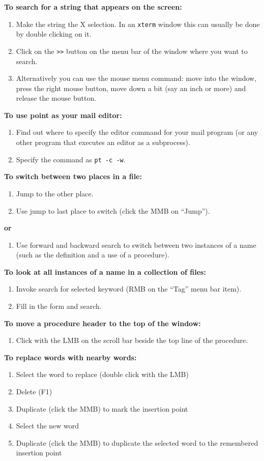 {\bf To search for a string that appears on the screen:}
\begin{enumerate}
\item Make the string the X selection.
In an {\tt xterm} window this can usually be done by double clicking on it.
\item Click on the {\tt>>} button on the menu bar of the window
where you want to search.
\item Alternatively you can use the mouse menu command:
move into the window, press the right mouse button,
move down a bit (say an inch or more) and release the mouse button.
\end{enumerate}

{\bf To use point as your mail editor:}
\begin{enumerate}
\item Find out where to specify the editor command for your mail program
(or any other program that executes an editor as a subprocess).
\item Specify the command as {\tt pt -c -w}.
\end{enumerate}

{\bf To switch between two places in a file:}
\begin{enumerate}
\item Jump to the other place.
\item Use jump to last place to switch (click the MMB on ``Jump'').
\end{enumerate}
{\bf or}
\begin{enumerate}
\item Use forward and backward search to switch between two
instances of a name (such as the definition and a use of a procedure).
\end{enumerate}

{\bf To look at all instances of a name in a collection of files:}
\begin{enumerate}
\item Invoke search for selected keyword (RMB on the ``Tag'' menu bar item).
\item Fill in the form and search.
\end{enumerate}

{\bf To move a procedure header to the top of the window:}
\begin{enumerate}
\item Click with the LMB on the scroll bar beside the top
line of the procedure.
\end{enumerate}

{\bf To replace words with nearby words:}
\begin{enumerate}
\item Select the word to replace (double click with the LMB)
\item Delete (F1)
\item Duplicate (click the MMB) to mark the insertion point
\item Select the new word
\item Duplicate (click the MMB) to duplicate the selected word
to the remembered insertion point
\end{enumerate}

